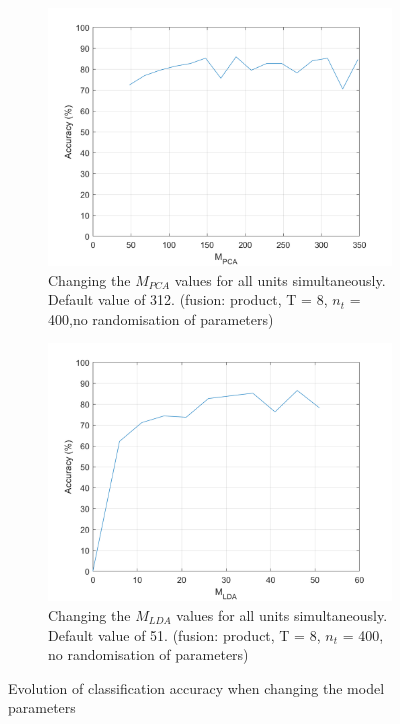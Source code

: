 \documentclass[10pt,technote]{IEEEtran}
\begin{document}
\begin{figure}[htb!]
    \centering
    \begin{subfigure}[b]{0.5\textwidth}
        \includegraphics[width=\textwidth]{../results/ex2LDAEnsemble/acc_vs_mpca.png}
        \caption{Changing the $M_{PCA}$ values for all units simultaneously. Default value of 312. (fusion: product, T = 8, $n_t$ = 400,no randomisation of parameters)}
        
        \quad
    \end{subfigure}
    \begin{subfigure}[b]{0.5\textwidth}
        \includegraphics[width=\textwidth]{../results/ex2LDAEnsemble/acc_vs_mlda.png}
        \caption{Changing the $M_{LDA}$ values for all units simultaneously. Default value of 51. (fusion: product, T = 8, $n_t$ = 400, no randomisation of parameters)}
        
        \quad
    \end{subfigure}
    \caption{Evolution of classification accuracy when changing the model parameters}
    \label{fig:mld_acc}
\end{figure}
\end{document}
